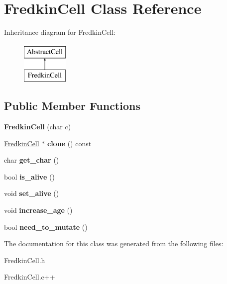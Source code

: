 \hypertarget{classFredkinCell}{\section{\-Fredkin\-Cell \-Class \-Reference}
\label{classFredkinCell}
}
\-Inheritance diagram for \-Fredkin\-Cell\-:\begin{figure}[H]
\begin{center}
\leavevmode
\includegraphics[height=2.000000cm]{classFredkinCell}
\end{center}
\end{figure}
\subsection*{\-Public \-Member \-Functions}
\begin{DoxyCompactItemize}
\item 
\hypertarget{classFredkinCell_aff02b3d1519e15693d74ae96d1b1de95}{{\bfseries \-Fredkin\-Cell} (char c)}\label{classFredkinCell_aff02b3d1519e15693d74ae96d1b1de95}

\item 
\hypertarget{classFredkinCell_a05d7cd1308b23d514e207317fdf06235}{\hyperlink{classFredkinCell}{\-Fredkin\-Cell} $\ast$ {\bfseries clone} () const }\label{classFredkinCell_a05d7cd1308b23d514e207317fdf06235}

\item 
\hypertarget{classFredkinCell_aaefaa838577787f93b82c3697d9045a5}{char {\bfseries get\-\_\-char} ()}\label{classFredkinCell_aaefaa838577787f93b82c3697d9045a5}

\item 
\hypertarget{classFredkinCell_abe9f18ada31ae38dffa35bc8b52f6987}{bool {\bfseries is\-\_\-alive} ()}\label{classFredkinCell_abe9f18ada31ae38dffa35bc8b52f6987}

\item 
\hypertarget{classFredkinCell_a17f4587be33395a4836c78303081e92a}{void {\bfseries set\-\_\-alive} ()}\label{classFredkinCell_a17f4587be33395a4836c78303081e92a}

\item 
\hypertarget{classFredkinCell_ab4f3c44be05ccb471d2bc24967a5539b}{void {\bfseries increase\-\_\-age} ()}\label{classFredkinCell_ab4f3c44be05ccb471d2bc24967a5539b}

\item 
\hypertarget{classFredkinCell_a76f620d4731e665ad6c5d0ca3bf32319}{bool {\bfseries need\-\_\-to\-\_\-mutate} ()}\label{classFredkinCell_a76f620d4731e665ad6c5d0ca3bf32319}

\end{DoxyCompactItemize}


\-The documentation for this class was generated from the following files\-:\begin{DoxyCompactItemize}
\item 
\-Fredkin\-Cell.\-h\item 
\-Fredkin\-Cell.\-c++\end{DoxyCompactItemize}
